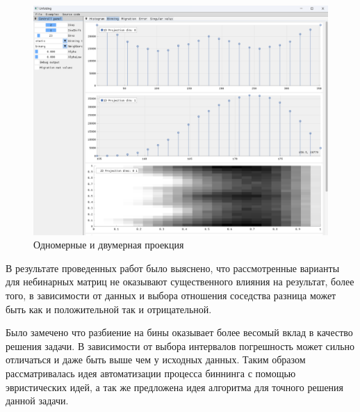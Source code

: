 \documentclass[a4paper,12pt]{diplom}
\begin{document}
\begin{figure}[h!]
   \centering
   \includegraphics[width=\linewidth]{images/binning_projections_example.png}
   \caption{Одномерные и двумерная проекция}
\end{figure}

В результате проведенных работ было выяснено, что рассмотренные варианты для небинарных матриц не оказывают существенного влияния на 
результат, более того, в зависимости от данных и выбора отношения соседства разница может быть как и положительной так и отрицательной. 

Было замечено что разбиение на бины оказывает более весомый вклад в качество решения задачи. В зависимости от выбора интервалов погрешность может 
сильно отличаться и даже быть выше чем у исходных данных. Таким образом рассматривалась идея автоматизации процесса биннинга с помощью эвристических 
идей, а так же предложена идея алгоритма для точного решения данной задачи.
\end{document}
